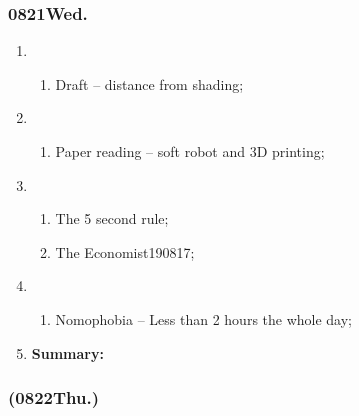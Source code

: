 \subsubsection{0821Wed.}
\begin{enumerate}
	\item \ncquaone
	\begin{enumerate}[(1)]
		\item Draft -- distance from shading;\rightundoneBlack
	\end{enumerate}
	
	\item \ncquatwo	
	\begin{enumerate}[(1)]
		\item Paper reading -- soft robot and 3D printing;\rightdone
	\end{enumerate}
	
	\item \ncquathree
	\begin{enumerate}[(1)]
		\item The 5 second rule;\rightdone
		\item The Economist190817;\rightdone
	\end{enumerate}
	
	\item \ncquafour	
	\begin{enumerate}[(1)]
		\item Nomophobia -- Less than 2 hours the whole day;\rightundoneBlack
	\end{enumerate}
	\item \textbf{Summary:}
\end{enumerate}
\subsubsection{(0822Thu.)}
